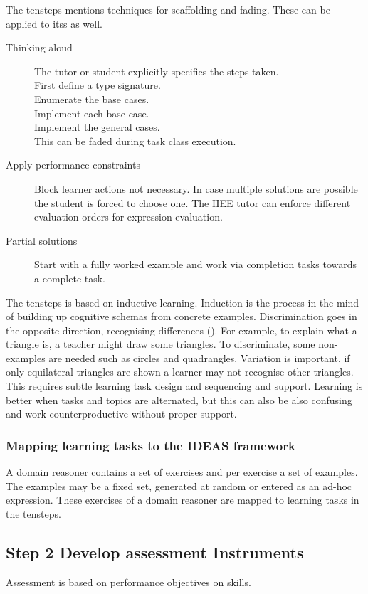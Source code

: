 The \gls{tensteps} mentions techniques for scaffolding and fading. These can be applied to \glspl{its} as well.
\begin{description}
\item[Thinking aloud] The tutor or student explicitly specifies the steps taken. \\
First define a type signature. \\
Enumerate the base cases. \\
Implement each base case.\\
Implement the general cases.\\
This can be faded during task class execution.
\item[Apply performance constraints] Block learner actions not necessary. In case multiple solutions are possible the student is forced to choose one.
The HEE tutor \citep{tutorHEE} can enforce different evaluation orders for expression evaluation.
\item[Partial solutions] Start with a fully worked example and work via completion tasks towards a complete task.
\end{description}

The \gls{tensteps} is based on inductive learning. 
Induction is the process in the mind of building up cognitive schemas from concrete examples. 
Discrimination goes in the opposite direction, recognising differences (\cite{Lewis198526}).
For example, to explain what a triangle is, a teacher might draw some triangles.
To discriminate, some non-examples are needed such as circles and quadrangles.
Variation is important, if only equilateral triangles are shown a learner may not recognise other triangles.
This requires subtle learning task design and sequencing and support.
Learning is better when tasks and topics are alternated, but this can also be also confusing and work counterproductive without proper support.

\subsubsection{Mapping learning tasks to the IDEAS framework}
A domain reasoner contains a set of exercises and per exercise a set  of examples.
The examples may be a fixed set, generated at random or entered as an ad-hoc expression.
These exercises of a domain reasoner are mapped to learning tasks in the \gls{tensteps}.




\subsection{Step 2 Develop assessment Instruments}
Assessment is based on performance objectives on skills.

